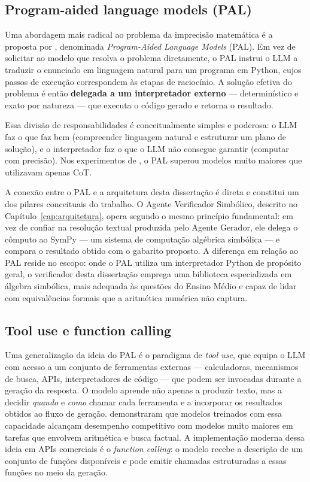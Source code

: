 \subsection{Program-aided language models (PAL)}
\label{sub:pal}

Uma abordagem mais radical ao problema da imprecisão matemática é a proposta por \citet{gao2023pal},
denominada \emph{Program-Aided Language Models} (PAL). Em vez de solicitar ao modelo que resolva o
problema diretamente, o PAL instrui o LLM a traduzir o enunciado em linguagem natural para um
programa em Python, cujos passos de execução correspondem às etapas de raciocínio. A solução efetiva
do problema é então \textbf{delegada a um interpretador externo} --- determinístico e exato por
natureza --- que executa o código gerado e retorna o resultado.

Essa divisão de responsabilidades é conceitualmente simples e poderosa: o LLM faz o que faz bem
(compreender linguagem natural e estruturar um plano de solução), e o interpretador faz o que o LLM
não consegue garantir (computar com precisão). Nos experimentos de \citet{gao2023pal}, o PAL superou
modelos muito maiores que utilizavam apenas CoT.

A conexão entre o PAL e a arquitetura desta dissertação é direta e constitui um dos pilares
conceituais do trabalho. O Agente Verificador Simbólico, descrito no Capítulo~\ref{cap:arquitetura}, opera
segundo o mesmo princípio fundamental: em vez de confiar na resolução textual produzida pelo Agente
Gerador, ele delega o cômputo ao SymPy --- um sistema de computação algébrica simbólica --- e compara
o resultado obtido com o gabarito proposto. A diferença em relação ao PAL reside no escopo: onde o
PAL utiliza um interpretador Python de propósito geral, o verificador desta dissertação emprega uma
biblioteca especializada em álgebra simbólica, mais adequada às questões do Ensino Médio e capaz de
lidar com equivalências formais que a aritmética numérica não captura.

\subsection{Tool use e function calling}
\label{sub:tooluse}

Uma generalização da ideia do PAL é o paradigma de \emph{tool use}, que equipa o LLM com acesso a um
conjunto de ferramentas externas --- calculadoras, mecanismos de busca, APIs, interpretadores de
código --- que podem ser invocadas durante a geração da resposta. O modelo aprende não apenas a
produzir texto, mas a decidir \emph{quando} e \emph{como} chamar cada ferramenta e a incorporar os
resultados obtidos ao fluxo de geração. \citet{schick2023toolformer} demonstraram que modelos
treinados com essa capacidade alcançam desempenho competitivo com modelos muito maiores em tarefas
que envolvem aritmética e busca factual. A implementação moderna dessa ideia em APIs comerciais é o
\emph{function calling}: o modelo recebe a descrição de um conjunto de funções disponíveis e pode
emitir chamadas estruturadas a essas funções no meio da geração.

